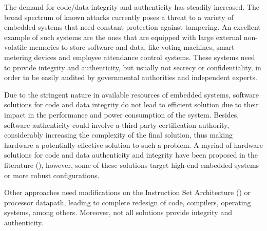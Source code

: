
The demand for code/data integrity and authenticity has steadily increased. The broad spectrum of known attacks currently poses a threat to a variety of embedded systems that need constant protection against tampering. An excellent example of such systems are the ones that are equipped with large external non-volatile memories to store software and data, like voting machines, smart metering devices and employee attendance control systems. These systems need to provide integrity and authenticity, but usually not secrecy or confidentiality, in order to be easily audited by governmental authorities and independent experts.

Due to the stringent nature in available resources of embedded systems, software solutions for code and data integrity do not lead to efficient solution due to their impact in the performance and power consumption of the system. Besides, software authenticity could involve a third-party certification authority, considerably increasing the complexity of the final solution, thus making hardware a potentially effective solution to such a problem. A myriad of hardware solutions for code and data authenticity and integrity have been proposed in the literature (\cite{Suh2005:AEGISImplementation,Vaslin2009:OTP,Hong2010:FEDTIC,Bobade2015:SecurityFPGA}), however, some of these solutions target high-end embedded systems or more robust configurations.


Other approaches need modifications on the Instruction Set Architecture (\isa) or processor datapath, leading to complete redesign of code, compilers, operating systems, among others. Moreover, not all solutions provide integrity and authenticity.

